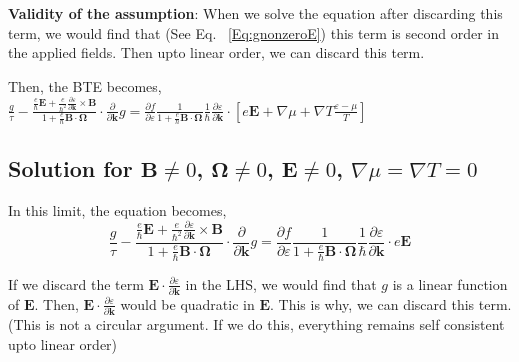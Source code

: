 \documentclass{revtex4-2}
\newcommand{\bvec}[1]{{\mathbf #1}}
\begin{document}
\textbf{Validity of the assumption}: When we solve the equation after discarding this term, we would find that (See Eq. ~\eqref{Eq:gnonzeroE}) this term is second order in the applied fields. Then upto linear order, we can discard this term.

Then, the BTE becomes,
$\frac{g}{\tau} -\frac{\frac{e}{\hbar} \bvec{E} +\frac{e}{\hbar^2} \frac{\partial \varepsilon}{\partial \bvec{k}} \times \bvec{B}}{1 + \frac{e}{\hbar} \bvec{B}\cdot\bvec{\Omega}} \cdot\frac{\partial}{\partial \bvec{k}} g = \frac{\partial f}{\partial \varepsilon}\frac{1}{1 + \frac{e}{\hbar} \bvec{B}\cdot\bvec{\Omega}}
\frac{1}{\hbar} \frac{\partial \varepsilon}{\partial \bvec{k}}\cdot\left[e \bvec{E} + \nabla{\mu} + \nabla T \frac{\varepsilon - \mu}{T}\right] $


\subsection{Solution for $\bvec{B}\neq0$, $\bvec{\Omega}\neq 0$, $\bvec{E} \neq 0$, $\nabla \mu = \nabla T = 0$}

In this limit, the equation becomes,
$$
\frac{g}{\tau} -\frac{\frac{e}{\hbar} \bvec{E} +\frac{e}{\hbar^2} \frac{\partial \varepsilon}{\partial \bvec{k}} \times \bvec{B}}{1 + \frac{e}{\hbar} \bvec{B}\cdot\bvec{\Omega}} \cdot\frac{\partial}{\partial \bvec{k}} g = \frac{\partial f}{\partial \varepsilon}\frac{1}{1 + \frac{e}{\hbar} \bvec{B}\cdot\bvec{\Omega}}
\frac{1}{\hbar} \frac{\partial \varepsilon}{\partial \bvec{k}}\cdot e \bvec{E} $$

If we discard the term $\bvec{E} \cdot \frac{\partial \varepsilon}{\partial \bvec{k}}$ in the LHS, we would find that $g$ is a linear function of $\bvec{E}$. Then, $\bvec{E} \cdot \frac{\partial \varepsilon}{\partial \bvec{k}}$ would be quadratic in $\bvec{E}$. This is why, we can discard this term. (This is not a circular argument. If we do this, everything remains self consistent upto linear order)
\end{document}
